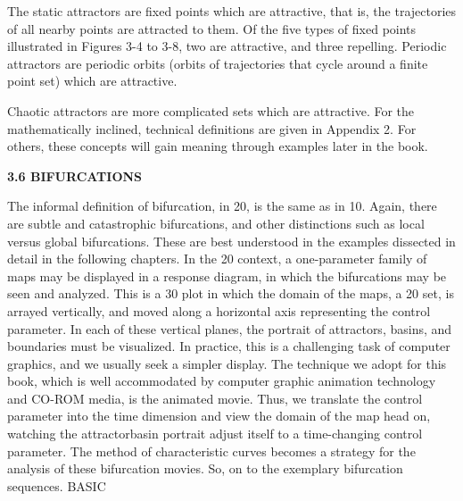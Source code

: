 \documentclass{article}
\begin{document}
The static attractors are fixed points which are attractive, that is, the
trajectories of all nearby points are attracted to them. Of the five types of
fixed points illustrated in Figures 3-4 to 3-8, two are attractive, and three
repelling. Periodic attractors are periodic orbits (orbits of trajectories
that cycle around a finite point set) which are attractive.

Chaotic attractors are more complicated sets which are attractive. For
the mathematically inclined, technical definitions are given in Appendix 2.
For others, these concepts will gain meaning through examples later in the
book.

\hfill

\textbf{3.6 BIFURCATIONS}

\hfill

The informal definition of bifurcation, in 20, is the same as in
10. Again, there are subtle and catastrophic bifurcations, and other
distinctions such as local versus global bifurcations. These are best
understood in the examples dissected in detail in the following
chapters.
In the 20 context, a one-parameter family of maps may be displayed
in a response diagram, in which the bifurcations may be
seen and analyzed. This is a 30 plot in which the domain of the
maps, a 20 set, is arrayed vertically, and moved along a horizontal
axis representing the control parameter. In each of these vertical
planes, the portrait of attractors, basins, and boundaries must be
visualized. In practice, this is a challenging task of computer graphics,
and we usually seek a simpler display. The technique we adopt
for this book, which is well accommodated by computer graphic
animation technology and CO-ROM media, is the animated movie.
Thus, we translate the control parameter into the time dimension
and view the domain of the map head on, watching the attractorbasin
portrait adjust itself to a time-changing control parameter.
The method of characteristic curves becomes a strategy for the
analysis of these bifurcation movies. So, on to the exemplary bifurcation
sequences.
BASIC
\end{document}
